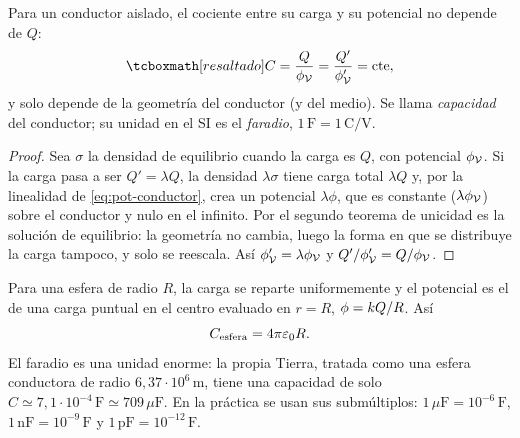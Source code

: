 \begin{teorema}[Capacidad]\label{teo:capacidad}
Para un conductor aislado, el cociente entre su carga y su potencial no depende de $Q$:
\begin{equation}\label{eq:capacidad}
  \resalta{C=\frac{Q}{\phi_{\Vc}}=\frac{Q'}{\phi'_{\Vc}}=\mathrm{cte},}
\end{equation}
y solo depende de la geometría del conductor (y del medio). Se llama \emph{capacidad} del conductor; su unidad en el SI es el
\emph{faradio}, $1\,\mathrm{F}=1\,\mathrm{C/V}$.
\end{teorema}
\begin{proof}
Sea $\sigma$ la densidad de equilibrio cuando la carga es $Q$, con potencial $\phi_{\mathcal{V}}$. Si la carga pasa a ser $Q'=\lambda Q$, la densidad
$\lambda\sigma$ tiene carga total $\lambda Q$ y, por la linealidad de \cref{eq:pot-conductor}, crea un potencial $\lambda\phi$, que es constante
($\lambda\phi_{\mathcal{V}}$) sobre el conductor y nulo en el infinito. Por el segundo teorema de unicidad es la solución de equilibrio: la geometría no cambia,
luego la forma en que se distribuye la carga tampoco, y solo se reescala. Así $\phi'_{\mathcal{V}}=\lambda\phi_{\mathcal{V}}$ y $Q'/\phi'_{\mathcal{V}}=Q/\phi_{\mathcal{V}}$.
\end{proof}

\begin{ejemplo}\label{ej:esfera}
Para una esfera de radio $R$, la carga se reparte uniformemente y el potencial es el de una carga puntual en el centro evaluado en $r=R$,
$\phi=k Q/R$. Así
\begin{equation}\label{eq:cap-esfera}
  C_{\text{esfera}}=4\pi\varepsilon_{0} R .
\end{equation}
El faradio es una unidad enorme: la propia Tierra, tratada como una esfera conductora de radio $6{,}37\cdot10^{6}\,\mathrm{m}$, tiene una capacidad de solo
$C\simeq7{,}1\cdot10^{-4}\,\mathrm{F}\simeq709\,\mu\mathrm{F}$. En la práctica se usan sus submúltiplos: $1\,\mu\mathrm{F}=10^{-6}\,\mathrm{F}$,
$1\,\mathrm{nF}=10^{-9}\,\mathrm{F}$ y $1\,\mathrm{pF}=10^{-12}\,\mathrm{F}$.
\end{ejemplo}
